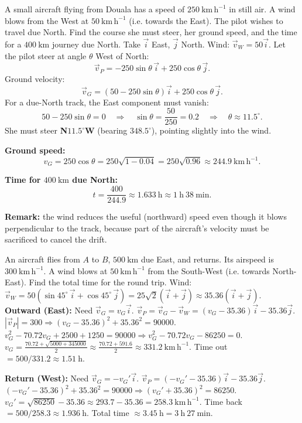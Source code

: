 \documentclass[11pt]{article}
\begin{document}
\begin{exoresolu}
A small aircraft flying from Douala has a speed of $250\ \mathrm{km\,h^{-1}}$ in still air. A wind blows from the West at $50\ \mathrm{km\,h^{-1}}$ (i.e. towards the East). The pilot wishes to travel due North. Find the course she must steer, her ground speed, and the time for a $400\ \mathrm{km}$ journey due North.
\tcblower
Take $\vec{i}$ East, $\vec{j}$ North. Wind: $\vec{v}_W = 50\vec{i}$. Let the pilot steer at angle $\theta$ West of North:
\[ \vec{v}_{P} = -250\sin\theta\,\vec{i} + 250\cos\theta\,\vec{j}. \]
Ground velocity:
\[ \vec{v}_G = (50 - 250\sin\theta)\vec{i} + 250\cos\theta\,\vec{j}. \]
For a due-North track, the East component must vanish:
\[ 50 - 250\sin\theta = 0 \quad\Longrightarrow\quad \sin\theta = \frac{50}{250} = 0.2 \quad\Longrightarrow\quad \theta \approx 11.5^\circ. \]
She must steer \textbf{N$11.5^\circ$W} (bearing $348.5^\circ$), pointing slightly into the wind.

\textbf{Ground speed:}
\[ v_G = 250\cos\theta = 250\sqrt{1 - 0.04} = 250\sqrt{0.96} \approx 244.9\ \mathrm{km\,h^{-1}}. \]

\textbf{Time for $400\ \mathrm{km}$ due North:}
\[ t = \frac{400}{244.9} \approx 1.633\ \mathrm{h} \approx 1\ \mathrm{h}\ 38\ \mathrm{min}. \]

\textbf{Remark:} the wind reduces the useful (northward) speed even though it blows perpendicular to the track, because part of the aircraft's velocity must be sacrificed to cancel the drift.
\end{exoresolu}

\begin{exoresolu}
An aircraft flies from $A$ to $B$, $500\ \mathrm{km}$ due East, and returns. Its airspeed is $300\ \mathrm{km\,h^{-1}}$. A wind blows at $50\ \mathrm{km\,h^{-1}}$ from the South-West (i.e. towards North-East). Find the total time for the round trip.
\tcblower
Wind: $\vec{v}_W = 50(\sin45^\circ\,\vec{i} + \cos45^\circ\,\vec{j}) = 25\sqrt{2}(\vec{i}+\vec{j}) \approx 35.36(\vec{i}+\vec{j})$.
\textbf{Outward (East):} Need $\vec{v}_G = v_G\vec{i}$. $\vec{v}_P = \vec{v}_G - \vec{v}_W = (v_G - 35.36)\vec{i} - 35.36\vec{j}$.
$|\vec{v}_P| = 300 \Rightarrow (v_G - 35.36)^2 + 35.36^2 = 90000$.
$v_G^2 - 70.72v_G + 2500 + 1250 = 90000 \Rightarrow v_G^2 - 70.72v_G - 86250 = 0$.
$v_G = \frac{70.72 + \sqrt{5000 + 345000}}{2} \approx \frac{70.72 + 591.6}{2} \approx 331.2\ \mathrm{km\,h^{-1}}$.
Time out $= 500/331.2 \approx 1.51\ \mathrm{h}$.

\textbf{Return (West):} Need $\vec{v}_G = -v_G'\vec{i}$. $\vec{v}_P = (-v_G' - 35.36)\vec{i} - 35.36\vec{j}$.
$(-v_G' - 35.36)^2 + 35.36^2 = 90000 \Rightarrow (v_G' + 35.36)^2 = 86250$.
$v_G' = \sqrt{86250} - 35.36 \approx 293.7 - 35.36 = 258.3\ \mathrm{km\,h^{-1}}$.
Time back $= 500/258.3 \approx 1.936\ \mathrm{h}$.
Total time $\approx 3.45\ \mathrm{h} = 3\ \mathrm{h}\ 27\ \mathrm{min}$.
\end{exoresolu}
\end{document}
